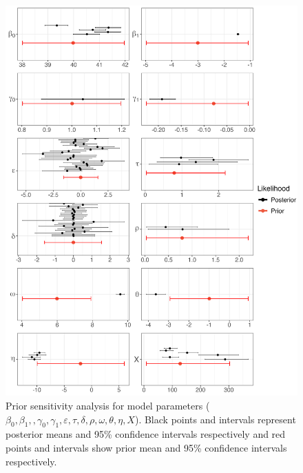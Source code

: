 \documentclass{article}
\begin{document}
\clearpage
\begin{figure}[tbhp] 
\centering
\includegraphics[width=15.5cm]{Plots/Diagnostic_Fig_2.jpg}  
\caption{Prior sensitivity analysis for model parameters ($\beta_0, \beta_1,, 
\gamma_0,\gamma_1,\varepsilon,\tau,\delta,\rho,\omega,\theta,\eta,X$). Black points and intervals represent posterior means and 95\% confidence intervals respectively and red points and intervals show prior mean and 95\% confidence intervals respectively.}
\label{fig:prior_sens}
\end{figure}


\end{document}

